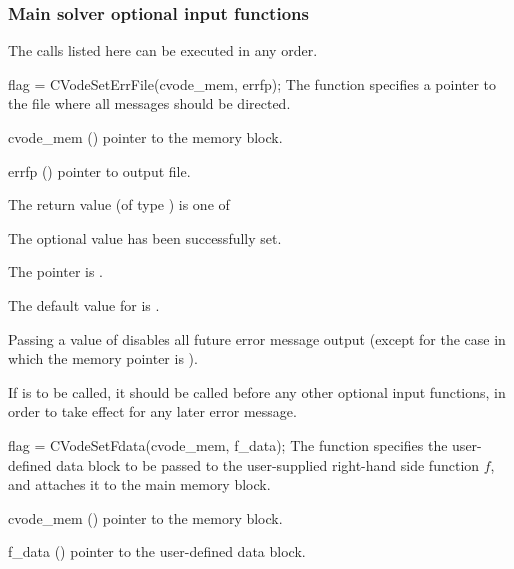 \subsubsection{Main solver optional input functions}\label{sss:optin_main}

The calls listed here can be executed in any order.

{
flag = CVodeSetErrFile(cvode\_mem, errfp);
}
{
  The function  specifies a pointer to the file
  where all {\cvodes} messages should be directed.
}
{
  \begin{args}
  \item[cvode\_mem] ()
    pointer to the {\cvodes} memory block.
  \item[errfp] ()
    pointer to output file.
  \end{args}
}
{
  The return value  (of type ) is one of
  \begin{args}
  \item[\Id{CV\_SUCCESS}] 
    The optional value has been successfully set.
  \item[\Id{CV\_MEM\_NULL}]
    The  pointer is .
  \end{args}
}
{
  The default value for  is . 

  Passing a value of  disables all future error message output
  (except for the case in which the {\cvodes} memory pointer is ).

  {\warn}If  is to be called, it should be called before any
  other optional input functions, in order to take effect for any later error message.
}
{
  flag = CVodeSetFdata(cvode\_mem, f\_data);
}
{
  The function  specifies the user-defined data block 
  to be passed to the user-supplied right-hand side function $f$, and attaches it to the main 
  {\cvodes} memory block.
}
{
  \begin{args}
  \item[cvode\_mem] ()
    pointer to the {\cvodes} memory block.
  \item[f\_data] ()
    pointer to the user-defined data block.
  \end{args}
}
